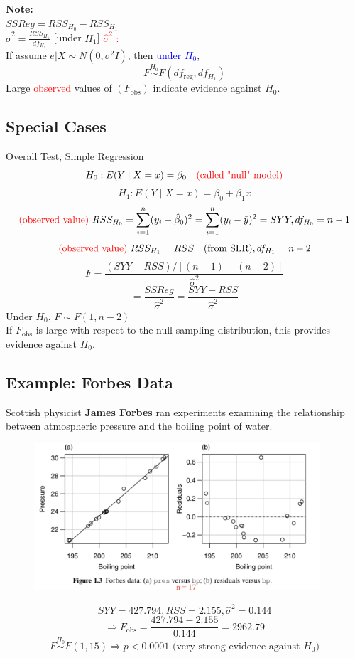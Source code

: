\documentclass[14pt]{extarticle}
\begin{document}
\noindent
\textbf{Note:}\\
$SSReg = RSS_{H_0} - RSS_{H_1}$\\
$\hat{\sigma}^2 = \frac{RSS_{H_1}}{df_{H_1}}$ [under $H_1$] \textcolor{red}{$\hat{\sigma}^2$ : }\\
If assume $e|X \sim N(0, \sigma^2 I)$, then \textcolor{blue}{under $H_0$}, 
\[
F \overset{H_0}{\sim} F(df_{\text{reg}}, df_{H_1})
\]
Large \textcolor{red}{observed} values of $(F_{\text{obs}})$ indicate evidence against $H_0$.

\subsection*{Special Cases}
Overall Test, Simple Regression
\[
H_0: E(Y \mid X = x) = \beta_0 \quad \textcolor{red}{\text{(called "null" model)}}
\]
\[
H_1: E(Y \mid X = x) = \beta_0 + \beta_1 x
\]
\[
\textcolor{red}{\text{(observed value) }}
RSS_{H_0} = \sum_{i=1}^{n} (y_i - \hat{\beta}_0)^2  = \sum_{i=1}^{n} (y_i - \bar{y})^2 = SYY
, df_{H_0} = n - 1
\]
\[
\textcolor{red}{\text{(observed value) }} RSS_{H_1} = RSS \quad \text{(from SLR)}, 
df_{H_1} = n - 2
\]
\[
F = \frac{(SYY - RSS) / \left[(n - 1) - (n - 2)\right]}{\hat{\sigma}^2}
\]
\[
= \frac{SSReg}{\hat{\sigma}^2} = \frac{SYY - RSS}{\hat{\sigma}^2}
\]
Under $H_0$, $F \sim F(1, n - 2)$\\
If $F_{\text{obs}}$ is large with respect to the null sampling distribution, this provides evidence against $H_0$.

\subsection*{Example: Forbes Data}

Scottish physicist \textbf{James Forbes} ran experiments examining the relationship between atmospheric pressure and the boiling point of water.
\begin{figure}[H]
    \centering
    \includegraphics[width=0.95\textwidth]{fig1.png}
\end{figure}
\[
SYY = 427.794, RSS = 2.155, \hat{\sigma}^2 = 0.144
\]
\[
\Rightarrow F_{\text{obs}} = \frac{427.794 - 2.155}{0.144}
= 2962.79
\]
\[
F \overset{H_0}{\sim} F(1, 15)
\Rightarrow p < 0.0001\text{ (very strong evidence against } H_0)
\]
\end{document}
